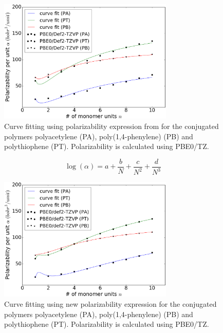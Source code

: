 \begin{figure}[htbp] 
	\centering
	\includegraphics[width=0.744\textwidth]{Chapter-3/Figures/Pol_fit_all_PBE0_TZ_old.eps}
	\caption{Curve fitting using polarizability expression from \cite{Hurst1988} for the conjugated polymers polyacetylene (PA), poly(1,4-phenylene) (PB) and polythiophene (PT). Polarizability is calculated using PBE0/TZ.} 
	\label{fig:Pol_fit_all_PBE0_TZ_old} 
\end{figure}  


\begin{equation} \label{eqn:2}
\log(\alpha)=a+\frac{b}{N}+\frac{c}{N^2}+\frac{d}{N^3}
\end{equation}


\begin{figure}[htbp] 
	\centering
	\includegraphics[width=0.744\textwidth]{Chapter-3/Figures/Pol_fit_all_PBE0_TZ.eps}
	\caption{Curve fitting using new polarizability expression for the conjugated polymers polyacetylene (PA), poly(1,4-phenylene) (PB) and polythiophene (PT). Polarizability is calculated using PBE0/TZ.} 
	\label{fig:Pol_fit_all_PBE0_TZ} 
\end{figure}  


